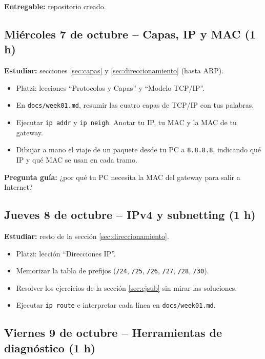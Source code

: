 \documentclass[11pt,a4paper]{article}
\theoremstyle{definition}
\theoremstyle{remark}
\newcommand{\cmd}[1]{\texttt{#1}}
\begin{document}
\textbf{Entregable:} repositorio creado.

\subsection{Miércoles 7 de octubre -- Capas, IP y MAC (1 h)}

\textbf{Estudiar:} secciones \ref{sec:capas} y \ref{sec:direccionamiento} (hasta ARP).

\begin{itemize}[label=$\square$]
  \item Platzi: lecciones ``Protocolos y Capas'' y ``Modelo TCP/IP''.
  \item En \texttt{docs/week01.md}, resumir las cuatro capas de TCP/IP con tus palabras.
  \item Ejecutar \cmd{ip addr} y \cmd{ip neigh}. Anotar tu IP, tu MAC y la MAC de tu gateway.
  \item Dibujar a mano el viaje de un paquete desde tu PC a \texttt{8.8.8.8}, indicando qué IP y qué MAC se usan en cada tramo.
\end{itemize}

\textbf{Pregunta guía:} ¿por qué tu PC necesita la MAC del gateway para salir a Internet?

\subsection{Jueves 8 de octubre -- IPv4 y subnetting (1 h)}

\textbf{Estudiar:} resto de la sección \ref{sec:direccionamiento}.

\begin{itemize}[label=$\square$]
  \item Platzi: lección ``Direcciones IP''.
  \item Memorizar la tabla de prefijos (\texttt{/24}, \texttt{/25}, \texttt{/26}, \texttt{/27}, \texttt{/28}, \texttt{/30}).
  \item Resolver los ejercicios de la sección \ref{sec:ejsub} sin mirar las soluciones.
  \item Ejecutar \cmd{ip route} e interpretar cada línea en \texttt{docs/week01.md}.
\end{itemize}

\subsection{Viernes 9 de octubre -- Herramientas de diagnóstico (1 h)}
\end{document}
